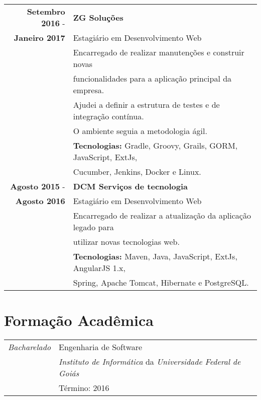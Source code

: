 \documentclass[a4paper,10pt]{article} %
\begin{document}
\begin{tabular}{r|l}

	\textbf{Setembro 2016} - & \textbf{ZG Soluções}\\
	\textbf{Janeiro 2017} & Estagiário em Desenvolvimento Web \\
	& Encarregado de realizar manutenções e construir novas\\
	& funcionalidades para a aplicação principal da empresa.\\
	& Ajudei a definir a estrutura de testes e de integração contínua.\\
	& O ambiente seguia a metodologia ágil.\\
	& \textbf{Tecnologias:} Gradle, Groovy, Grails, GORM, JavaScript, ExtJs, \\
	& Cucumber, Jenkins, Docker e Linux. \\

	\textbf{Agosto 2015} - & \textbf{DCM Serviços de tecnologia} \\
	\textbf{Agosto 2016} & Estagiário em Desenvolvimento Web \\
	& Encarregado de realizar a atualização da aplicação legado para \\
	& utilizar novas tecnologias web. \\
	& \textbf{Tecnologias:} Maven, Java, JavaScript, ExtJs, AngularJS 1.x, \\
	& Spring, Apache Tomcat, Hibernate e PostgreSQL. \\

\end{tabular}



\section{Formação Acadêmica}

\begin{tabular}{r|p{11cm}}
	\emph{Bacharelado} & Engenharia de Software \\
	& \emph{Instituto de Informática} da \emph{Universidade Federal de Goiás} \\
	& Término: 2016\\
\end{tabular}

\end{document}
